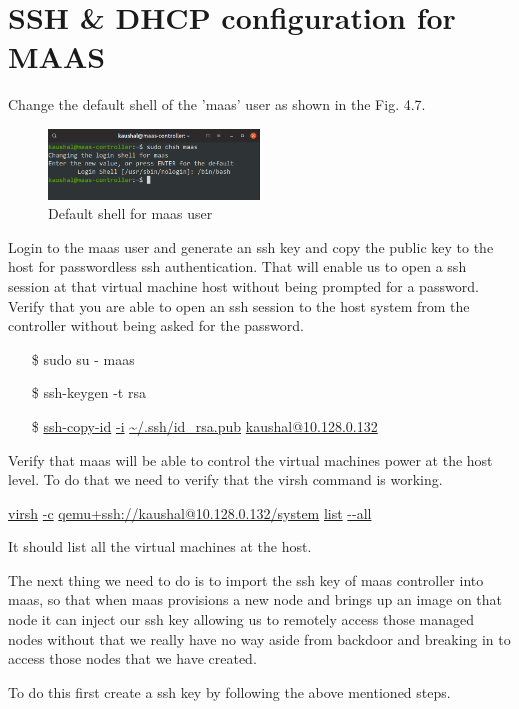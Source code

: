 \section{SSH \& DHCP configuration for MAAS}

Change the default shell of the 'maas' user as shown in the Fig. 4.7.

\begin{figure}[!ht]
    \centering
    \includegraphics[width=0.5\textwidth]{images/4-7.png}
    \caption{Default shell for maas user}
\end{figure}

Login to the maas user and generate an ssh key and copy the public key to the host for passwordless ssh authentication. That will enable us to open a ssh session at that virtual machine host without being prompted for a password. Verify that you are able to open an ssh session to the host system from the controller without being asked for the password.

\begin{enumerate}
    \setlength\itemsep{-1em}
    \item[\$] sudo su - maas
    \item[\$] ssh-keygen -t rsa
    \item[\$] \url{ssh-copy-id} \url{-i} \url{~/.ssh/id_rsa.pub} \url{kaushal@10.128.0.132}
\end{enumerate}

Verify that maas will be able to control the virtual machines power at the host level. To do that we need to verify that the virsh command is working.

\url{virsh} \url{-c} \url{qemu+ssh://kaushal@10.128.0.132/system} \url{list} \url{--all}

It should list all the virtual machines at the host.

The next thing we need to do is to import the ssh key of maas controller into maas, so that when maas provisions a new node and brings up an image on that node it can inject our ssh key allowing us to remotely access those managed nodes without that we really have no way aside from backdoor and breaking in to access those nodes that we have created.

To do this first create a ssh key by following the above mentioned steps.

